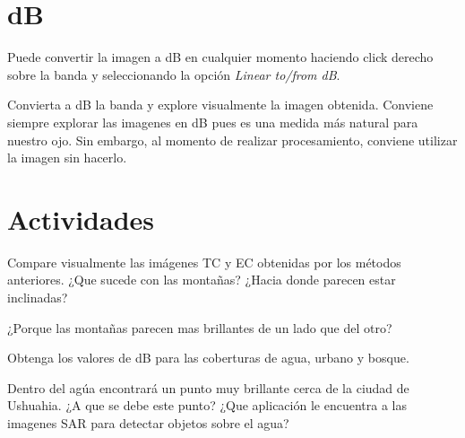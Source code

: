 \section{dB}

Puede convertir la imagen a dB en cualquier momento haciendo click derecho sobre la banda y seleccionando la opción \emph{Linear to/from dB}.

Convierta a dB la banda  y explore visualmente la imagen obtenida. Conviene siempre explorar las imagenes en dB pues es una medida más natural para nuestro ojo. Sin embargo, al momento de realizar procesamiento, conviene utilizar la imagen sin hacerlo.

\section{Actividades}

\begin{que}
    Compare visualmente las imágenes TC y EC obtenidas por los métodos anteriores. ¿Que sucede con las montañas? ¿Hacia donde parecen estar inclinadas?
\end{que}

\begin{que}
    ¿Porque las montañas parecen mas brillantes de un lado que del otro?
\end{que}

\begin{que}
    Obtenga los valores de dB para las coberturas de agua, urbano y bosque.
\end{que}

\begin{que}
    Dentro del agúa encontrará un punto muy brillante cerca de la ciudad de Ushuahia. ¿A que se debe este punto? ¿Que aplicación le encuentra a las imagenes SAR para detectar objetos sobre el agua?
\end{que}
